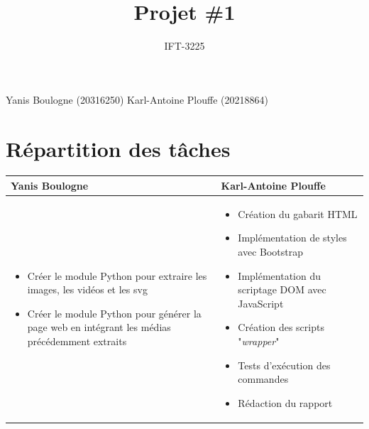 \documentclass{article}
\title{Projet \#1}
\author{IFT-3225}
\begin{document}
\maketitle

\newcommand \mML {\ensuremath\mu\textsl{ML}}
\newcommand \kw [1] {\textsf{#1}}
\newcommand \id [1] {\textsl{#1}}
\newcommand \punc [1] {\kw{`#1'}}
\newcommand \str [1] {\texttt{"#1"}}
\newenvironment{outitemize}{
  \begin{itemize}
  \let \origitem \item \def \item {\origitem[]\hspace{-18pt}}
}{
  \end{itemize}
}
\newcommand \Align [2][t] {\begin{array}[#1]{@{}l} #2 \end{array}}

\noindent Yanis Boulogne (20316250)\newline
Karl-Antoine Plouffe (20218864) \newline

\section{Répartition des tâches}
\bgroup
\begin{table}[htbp]
\centering
    \setlength{\leftmargini}{0.5cm}
    \begin{tabular}{| m{5cm} | m{5cm} |}
        \hline
        Yanis Boulogne & Karl-Antoine Plouffe \\
        \hline
        \begin{itemize} 
            \item Créer le module Python pour extraire les images, les vidéos et les svg
            \item Créer le module Python pour générer la page web en intégrant les médias précédemment extraits
        \end{itemize} & 
        \begin{itemize} 
            \item Création du gabarit HTML
            \item Implémentation de styles avec Bootstrap
            \item Implémentation du scriptage DOM avec JavaScript
            \item Création des scripts "\textit{wrapper}"
            \item Tests d'exécution des commandes
            \item Rédaction du rapport
        \end{itemize} \\
        \hline
    \end{tabular}
\end{table}
\egroup
\end{document}
